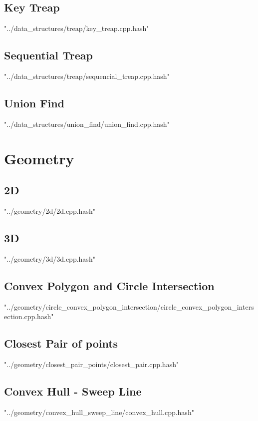 \documentclass [12pt,onecolumn,oneside]{article}
\begin{document}
\subsection{ Key Treap}
 {"../data_structures/treap/key_treap.cpp.hash"}
\newpage

\subsection{ Sequential Treap}
 {"../data_structures/treap/sequencial_treap.cpp.hash"}
\newpage

\subsection{ Union Find}
 {"../data_structures/union_find/union_find.cpp.hash"}
\newpage


\section{Geometry}
\subsection{ 2D}
 {"../geometry/2d/2d.cpp.hash"}
\newpage

\subsection{ 3D}
 {"../geometry/3d/3d.cpp.hash"}
\newpage

\subsection{ Convex Polygon and Circle Intersection}
 {"../geometry/circle_convex_polygon_intersection/circle_convex_polygon_intersection.cpp.hash"}
\newpage

\subsection{ Closest Pair of points}
 {"../geometry/closest_pair_points/closest_pair.cpp.hash"}
\newpage

\subsection{ Convex Hull - Sweep Line}
 {"../geometry/convex_hull_sweep_line/convex_hull.cpp.hash"}
\newpage
\end{document}
